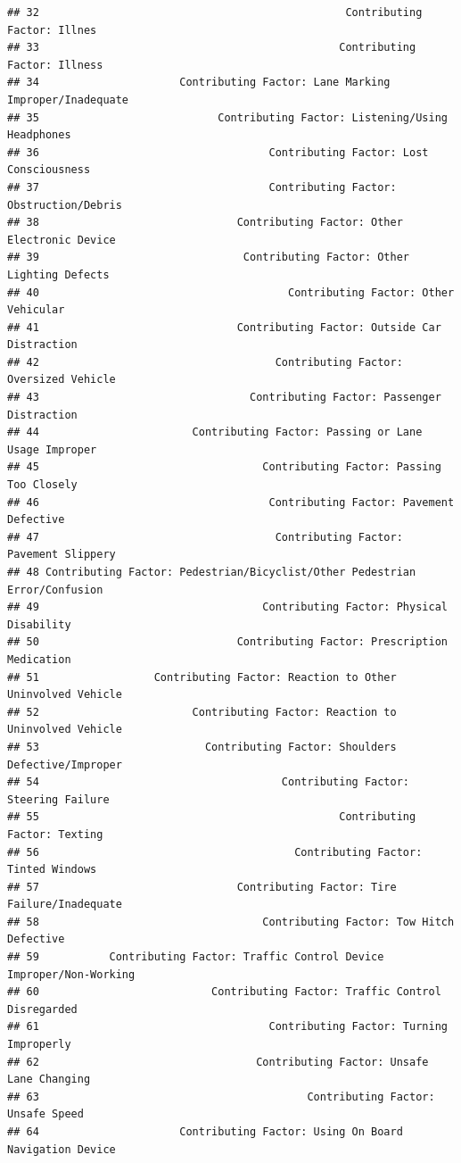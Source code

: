 \documentclass[10pt]{article}\usepackage[]{graphicx}\usepackage[]{xcolor}
\makeatletter
\newenvironment{kframe}{%
 \def\at@end@of@kframe{}%
 \ifinner\ifhmode%
  \def\at@end@of@kframe{\end{minipage}}%
  \begin{minipage}{\columnwidth}%
 \fi\fi%
 \def\FrameCommand##1{\hskip\@totalleftmargin \hskip-\fboxsep
 \colorbox{shadecolor}{##1}\hskip-\fboxsep
     \hskip-\linewidth \hskip-\@totalleftmargin \hskip\columnwidth}%
 \MakeFramed {\advance\hsize-\width
   \@totalleftmargin\z@ \linewidth\hsize
   \@setminipage}}%
 {\par\unskip\endMakeFramed%
 \at@end@of@kframe}
\newenvironment{knitrout}{}{} %
\makeatother
\begin{document}
\begin{knitrout}
\begin{kframe}
\begin{verbatim}
## 32                                                Contributing Factor: Illnes
## 33                                               Contributing Factor: Illness
## 34                      Contributing Factor: Lane Marking Improper/Inadequate
## 35                            Contributing Factor: Listening/Using Headphones
## 36                                    Contributing Factor: Lost Consciousness
## 37                                    Contributing Factor: Obstruction/Debris
## 38                               Contributing Factor: Other Electronic Device
## 39                                Contributing Factor: Other Lighting Defects
## 40                                       Contributing Factor: Other Vehicular
## 41                               Contributing Factor: Outside Car Distraction
## 42                                     Contributing Factor: Oversized Vehicle
## 43                                 Contributing Factor: Passenger Distraction
## 44                        Contributing Factor: Passing or Lane Usage Improper
## 45                                   Contributing Factor: Passing Too Closely
## 46                                    Contributing Factor: Pavement Defective
## 47                                     Contributing Factor: Pavement Slippery
## 48 Contributing Factor: Pedestrian/Bicyclist/Other Pedestrian Error/Confusion
## 49                                   Contributing Factor: Physical Disability
## 50                               Contributing Factor: Prescription Medication
## 51                  Contributing Factor: Reaction to Other Uninvolved Vehicle
## 52                        Contributing Factor: Reaction to Uninvolved Vehicle
## 53                          Contributing Factor: Shoulders Defective/Improper
## 54                                      Contributing Factor: Steering Failure
## 55                                               Contributing Factor: Texting
## 56                                        Contributing Factor: Tinted Windows
## 57                               Contributing Factor: Tire Failure/Inadequate
## 58                                   Contributing Factor: Tow Hitch Defective
## 59           Contributing Factor: Traffic Control Device Improper/Non-Working
## 60                           Contributing Factor: Traffic Control Disregarded
## 61                                    Contributing Factor: Turning Improperly
## 62                                  Contributing Factor: Unsafe Lane Changing
## 63                                          Contributing Factor: Unsafe Speed
## 64                      Contributing Factor: Using On Board Navigation Device

\end{verbatim}
\end{kframe}
\end{knitrout}
\end{document}

